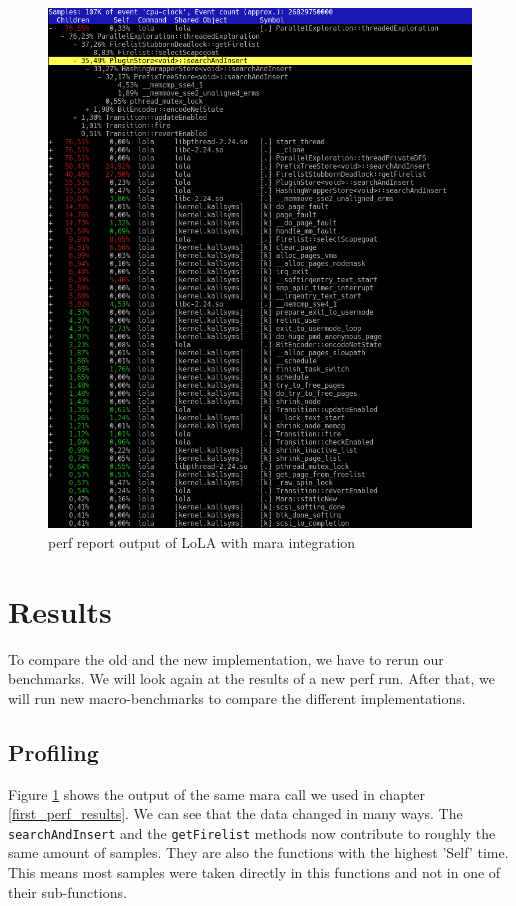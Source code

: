\begin{figure}
    \centering
    \includegraphics[width=\textwidth]{pictures/perfReportMara.png}
    \caption{perf report output of LoLA with mara integration}
    \label{perf_record_mara}
\end{figure}

\section{Results}
To compare the old and the new implementation, we have to rerun our benchmarks. We will look again at the results of a new perf run. After that, we will run new macro-benchmarks to compare the different implementations.

\subsection{Profiling}
 Figure \ref{perf_record_mara} shows the output of the same mara call we used in chapter \ref{first_perf_results}. We can see that the data changed in many ways. The \texttt{searchAndInsert} and the \texttt{getFirelist} methods now contribute to roughly the same amount of samples. They are also the functions with the highest 'Self' time. This means most samples were taken directly in this functions and not in one of their sub-functions.

